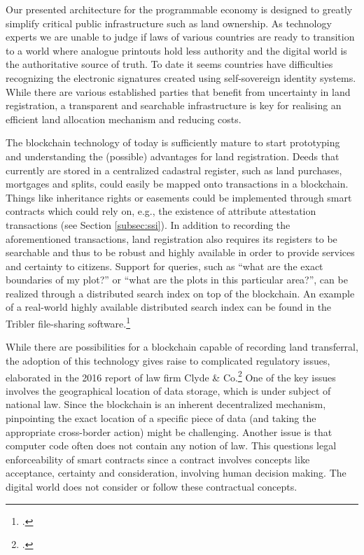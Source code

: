 \documentclass[USenglish]{article}
\begin{document}
Our presented architecture for the programmable economy is designed to greatly simplify critical public infrastructure such as land ownership.
As technology experts we are unable to judge if laws of various countries are ready to transition to a world where analogue printouts hold less authority and the digital world is the authoritative source of truth.
To date it seems countries have difficulties recognizing the electronic signatures created using self-sovereign identity systems.
While there are various established parties that benefit from uncertainty in land registration, a transparent and searchable infrastructure is key for realising an efficient land allocation mechanism and reducing costs.

The blockchain technology of today is sufficiently mature to start prototyping and understanding the (possible) advantages for land registration. 
Deeds that currently are stored in a centralized cadastral register, such as land purchases, mortgages and splits, could easily be mapped onto transactions in a blockchain.
Things like inheritance rights or easements could be implemented through smart contracts which could rely on, e.g., the existence of attribute attestation transactions (see Section \ref{subsec:ssi}).
In addition to recording the aforementioned transactions, land registration also requires its registers to be searchable and thus to be robust and highly available in order to provide services and certainty to citizens.
Support for queries, such as ``what are the exact boundaries of my plot?'' or ``what are the plots in this particular area?'', can be realized through a distributed search index on top of the blockchain.
An example of a real-world highly available distributed search index can be found in the Tribler file-sharing software.\footcite{pouwelse2008tribler}

While there are possibilities for a blockchain capable of recording land transferral, the adoption of this technology gives raise to complicated regulatory issues, elaborated in the 2016 report of law firm Clyde \& Co.\footcite{clydeco2016blockchainlaw}
One of the key issues involves the geographical location of data storage, which is under subject of national law.
Since the blockchain is an inherent decentralized mechanism, pinpointing the exact location of a specific piece of data (and taking the appropriate cross-border action) might be challenging.
Another issue is that computer code often does not contain any notion of law.
This questions legal enforceability of smart contracts since a contract involves concepts like acceptance, certainty and consideration, involving human decision making.
The digital world does not consider or follow these contractual concepts.
\end{document}
